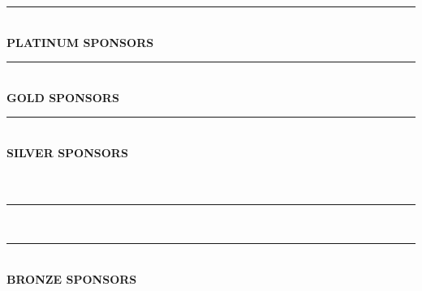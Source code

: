 \begin{center}
\rule{12cm}{1pt}\\[12pt]


\textsf{\textbf{\Large PLATINUM SPONSORS}}\\[12pt]

\hspace{\separationwidth}

\vspace{5mm}
\rule{12cm}{1pt}\\[12pt]
\textsf{\textbf{\Large GOLD SPONSORS}}\\[5mm]

\vspace{5mm}
\rule{12cm}{1pt}\\[12pt]
\textsf{\textbf{\LARGE SILVER SPONSORS}}\\[5mm]

\hspace{\separationwidth}
\\
\vspace{\separationwidth}
\hspace{\separationwidth}
\\
\vspace{\separationwidth}
\hspace{\separationwidth}
\hspace{\separationwidth}

\vspace{5mm}
\rule{12cm}{1pt}\\[12pt]

\clearpage
\rule{12cm}{1pt}\\[12pt]
\textsf{\textbf{\Large BRONZE SPONSORS}}\\[5mm]
\hspace{\separationwidth}
\hspace{\separationwidth}
\\
\vspace{\separationwidth}
\hspace{\separationwidth}


\end{center}
